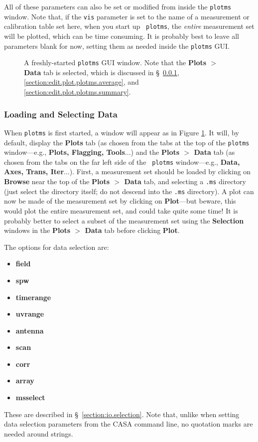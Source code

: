 \normalsize All of these parameters can also be set or modified from
inside the {\tt plotms} window. Note that, if the {\tt vis} parameter
is set to the name of a measurement or calibration table set here, when you start up {\tt
  plotms}, the {\it entire} measurement set will be plotted, which can
be time consuming. It is probably best to leave all parameters blank
for now, setting them as needed inside the {\tt plotms} GUI.

\begin{figure}[h!]
\begin{center}
\caption{\label{fig:plotms_empty} A freshly-started {\tt plotms} GUI
  window. Note that the {\bf Plots $>$ Data} tab is selected, which is
  discussed in \S~\ref{section:edit.plot.plotms.select},
  \ref{section:edit.plot.plotms.average}, and
  \ref{section:edit.plot.plotms.summary}.}
\hrulefill
\end{center}
\end{figure}

\subsubsection{Loading and Selecting Data}
\label{section:edit.plot.plotms.select}

When {\tt plotms} is first started, a window will appear as in Figure
\ref{fig:plotms_empty}. It will, by default, display the {\bf Plots}
tab (as chosen from the tabs at the top of the {\tt plotms}
window---e.g., {\bf Plots, Flagging, Tools}...) and the {\bf Plots $>$
  Data} tab (as chosen from the tabs on the far left side of the {\tt
  plotms} window---e.g., {\bf Data, Axes, Trans, Iter}...). First, a
measurement set should be loaded by clicking on {\bf Browse} near the
top of the {\bf Plots $>$ Data} tab, and selecting a {\tt .ms}
directory (just select the directory itself; do not descend into the
{\tt .ms} directory). A plot can now be made of the measurement set by
clicking on {\bf Plot}---but beware, this would plot the entire
measurement set, and could take quite some time! It is probably better
to select a subset of the measurement set using the {\bf Selection}
windows in the {\bf Plots $>$ Data} tab before clicking {\bf
  Plot}. 

The options for data selection are:
\begin{itemize}
   \item {\bf field}
   \item {\bf spw}
   \item {\bf timerange}
   \item {\bf uvrange}
   \item {\bf antenna}
   \item {\bf scan}
   \item {\bf corr}
   \item {\bf array}
   \item {\bf msselect}
\end{itemize}
These are described in \S~\ref{section:io.selection}. Note that,
unlike when setting data selection parameters from the CASA command
line, no quotation marks are needed around strings.

